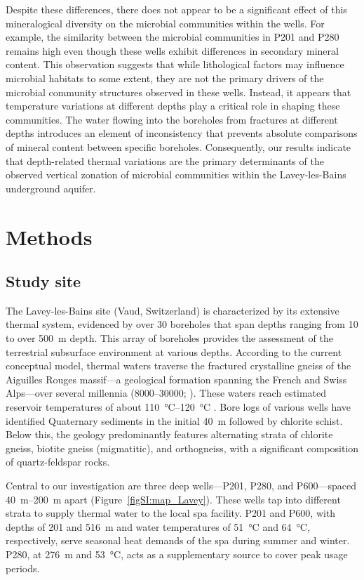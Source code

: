 Despite these differences, there does not appear to be a significant effect of this mineralogical diversity on the microbial communities within the wells.
For example, the similarity between the microbial communities in P201 and P280 remains high even though these wells exhibit differences in secondary mineral content.
This observation suggests that while lithological factors may influence microbial habitats to some extent, they are not the primary drivers of the microbial community structures observed in these wells.
Instead, it appears that temperature variations at different depths play a critical role in shaping these communities.
The water flowing into the boreholes from fractures at different depths introduces an element of inconsistency that prevents absolute comparisons of mineral content between specific boreholes.
Consequently, our results indicate that depth-related thermal variations are the primary determinants of the observed vertical zonation of microbial communities within the Lavey-les-Bains underground aquifer.

\section{Methods}
\subsection{Study site}
The Lavey-les-Bains site (Vaud, Switzerland) is characterized by its extensive thermal system, evidenced by over 30 boreholes that span depths ranging from 10 to over \SI{500}{\meter} depth.
This array of boreholes provides the assessment of the terrestrial subsurface environment at various depths.
According to the current conceptual model, thermal waters traverse the fractured crystalline gneiss of the Aiguilles Rouges massif---a geological formation spanning the French and Swiss Alps---over several millennia (\SIrange{8000}{30000}{\year}; \cite{sonney2009numerical, bianchetti1994hydrogeologie}).
These waters reach estimated reservoir temperatures of about \SIrange{110}{120}{\celsius} \citep{sonney2009numerical, wanner2019quantification}.
Bore logs of various wells \citep{swisstopo2024lavey1} have identified Quaternary sediments in the initial \SI{40}{\meter} followed by chlorite schist. 
Below this, the geology predominantly features alternating strata of chlorite gneiss, biotite gneiss (migmatitic), and orthogneiss, with a significant composition of quartz-feldspar rocks.

Central to our investigation are three deep wells---P201, P280, and P600---spaced \SIrange{40}{200}{\meter} apart (Figure~\ref{figSI:map_Lavey}).
These wells tap into different strata to supply thermal water to the local spa facility.
P201 and P600, with depths of 201 and \SI{516}{\meter} and water temperatures of \SI{51}{\celsius} and \SI{64}{\celsius}, respectively, serve seasonal heat demands of the spa during summer and winter. 
P280, at \SI{276}{\meter} and \SI{53}{\celsius}, acts as a supplementary source to cover peak usage periods.


